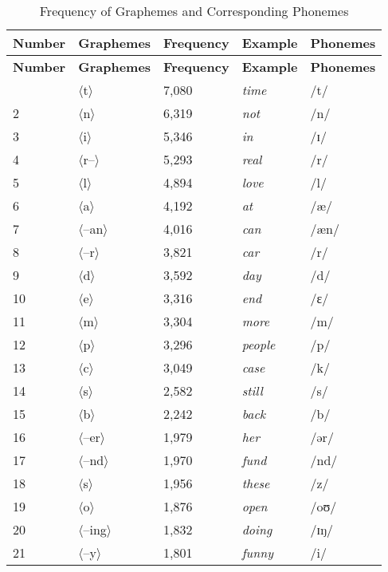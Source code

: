 \begin{longtable}{lllll}
\caption{Frequency of Graphemes and Corresponding Phonemes} \label{tab:gpcs} \\
\hline
\textbf{Number} & \textbf{Graphemes} & \textbf{Frequency} & \textbf{Example} & \textbf{Phonemes} \\
\hline
\endfirsthead
\hline
\textbf{Number} & \textbf{Graphemes} & \textbf{Frequency} & \textbf{Example} & \textbf{Phonemes} \\
\hline
\endhead
\endfoot

\hline \hline
\endlastfoot
1 & $\langle$t$\rangle$ & 7,080 & \textit{time} & /t/ \\
2 & $\langle$n$\rangle$ & 6,319 & \textit{not} & /n/ \\
3 & $\langle$i$\rangle$ & 5,346 & \textit{in} & /ɪ/ \\
4 & $\langle$r--$\rangle$ & 5,293 & \textit{real} & /r/ \\
5 & $\langle$l$\rangle$ & 4,894 & \textit{love} & /l/ \\
6 & $\langle$a$\rangle$ & 4,192 & \textit{at} & /æ/ \\
7 & $\langle$--an$\rangle$ & 4,016 & \textit{can} & /æn/ \\
8 & $\langle$--r$\rangle$ & 3,821 & \textit{car} & /r/ \\
9 & $\langle$d$\rangle$ & 3,592 & \textit{day} & /d/ \\
10 & $\langle$e$\rangle$ & 3,316 & \textit{end} & /ɛ/ \\
11 & $\langle$m$\rangle$ & 3,304 & \textit{more} & /m/ \\
12 & $\langle$p$\rangle$ & 3,296 & \textit{people} & /p/ \\
13 & $\langle$c$\rangle$ & 3,049 & \textit{case} & /k/ \\
14 & $\langle$s$\rangle$ & 2,582 & \textit{still} & /s/ \\
15 & $\langle$b$\rangle$ & 2,242 & \textit{back} & /b/ \\
16 & $\langle$--er$\rangle$ & 1,979 & \textit{her} & /ər/ \\
17 & $\langle$--nd$\rangle$ & 1,970 & \textit{fund} & /nd/ \\
18 & $\langle$s$\rangle$ & 1,956 & \textit{these} & /z/ \\
19 & $\langle$o$\rangle$ & 1,876 & \textit{open} & /oʊ/ \\
20 & $\langle$--ing$\rangle$ & 1,832 & \textit{doing} & /ɪŋ/ \\
21 & $\langle$--y$\rangle$ & 1,801 & \textit{funny} & /i/ \\

\end{longtable}
